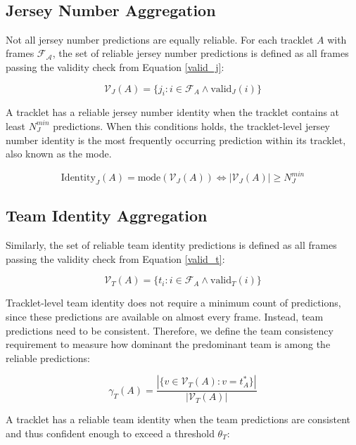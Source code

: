 \

\subsection{Jersey Number Aggregation}
Not all jersey number predictions are equally reliable. For each tracklet $A$ with frames $\mathcal{F_A}$, the set of reliable jersey number predictions is defined as all frames passing the validity check from Equation \ref{valid_j}:

\begin{equation}
    \mathcal{V}_J(A) = \{j_i : i \in \mathcal{F}_A \land \text{valid}_J(i)\}
\end{equation}

A tracklet has a reliable jersey number identity when the tracklet contains at least $N_J^{min}$ predictions. When this conditions holds, the tracklet-level jersey number identity is the most frequently occurring prediction within its tracklet, also known as the mode.

\begin{equation}
    \text{Identity}_J(A) = \text{mode}(\mathcal{V}_J(A)) \iff |\mathcal{V}_J(A)| \geq N_J^{min}
\end{equation}

\subsection{Team Identity Aggregation}
Similarly, the set of reliable team identity predictions is defined as all frames passing the validity check from Equation \ref{valid_t}:

\begin{equation}
    \mathcal{V}_T(A) = \{t_i : i \in \mathcal{F}_A \land \text{valid}_T(i)\}
\end{equation}

Tracklet-level team identity does not require a minimum count of predictions, since these predictions are available on almost every frame. Instead, team predictions need to be consistent. Therefore, we define the team consistency requirement to measure how dominant the predominant team is among the reliable predictions:

\begin{equation}
    \gamma_T(A)=\frac{|\{v \in \mathcal{V}_T(A):v=t_A^*\}|}{|\mathcal{V}_T(A)|}
\end{equation}

A tracklet has a reliable team identity when the team predictions are consistent and thus confident enough to exceed a threshold $\theta_T$:

